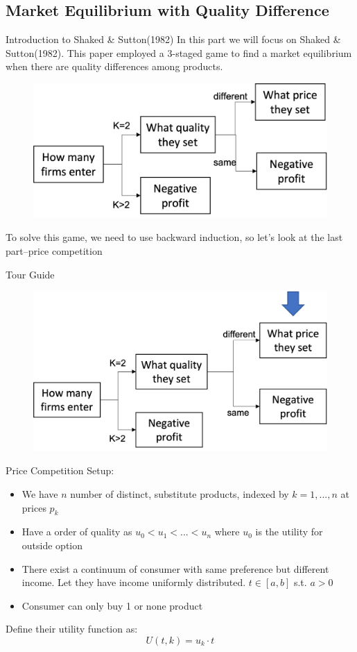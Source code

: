 \documentclass[10pt]{beamer}
\begin{document}
\subsection{Market Equilibrium with Quality Difference}
\begin{frame}{Introduction to Shaked \& Sutton(1982)}
In this part we will focus on Shaked \& Sutton(1982).
This paper employed a 3-staged game to find a market equilibrium when there are quality differences among products.
\begin{figure}
    \centering
    \includegraphics[width = .7\textwidth]{shaked1.png}
\end{figure}
To solve this game, we need to use backward induction, so let's look at the last part--price competition
\end{frame}

\begin{frame}{Tour Guide}
\begin{figure}
    \centering
    \includegraphics[width = .9\textwidth]{guide1.png}

\end{figure}
    
\end{frame}
\begin{frame}{Price Competition}
Setup:
\begin{itemize}
    \item We have $n$ number of distinct, substitute products, indexed by $k = 1,...,n$ at prices $p_k$
    \item Have a order of quality as $u_0 < u_1 <... < u_n$ where $u_0$ is the utility for outside option
    \item There exist a continuum of consumer with same preference but different income. Let they have income uniformly distributed. $t \in [a,b]$ s.t. $a > 0$
    \item Consumer can only buy 1 or none product
\end{itemize}
Define their utility function as:
\begin{equation}
    U(t,k) = u_k \cdot t
\end{equation}

    
\end{frame}
\end{document}
